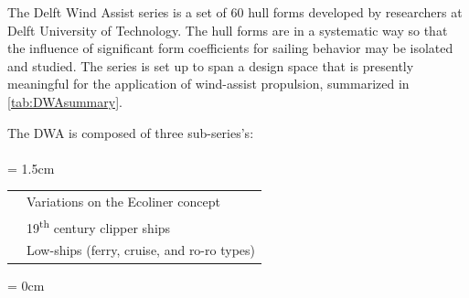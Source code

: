 \documentclass[twoside,twocolumn]{article}
\begin{document}
The Delft Wind Assist series is a set of 60 hull forms developed by researchers at Delft University of Technology. The hull forms are  in a systematic way so that the influence of significant form coefficients for sailing behavior may be isolated and studied. The series is set up to span a design space that is presently meaningful for the application of wind-assist propulsion, summarized in \cref{tab:DWAsummary}.

The DWA is composed of three sub-series's: \\
\\ 
\leftskip = 1.5cm
\begin{tabular}[!th]{p{1.5cm}p{4cm}}
	\firstseries & Variations on the Ecoliner concept \cite{Ecoliner} \\
	\secondseries &  19\textsuperscript{th} century clipper ships \\ 
	\thirdseries & Low-\Cp \space ships (ferry, cruise, and ro-ro types) \\ 
\end{tabular}
\leftskip = 0cm
\end{document}
